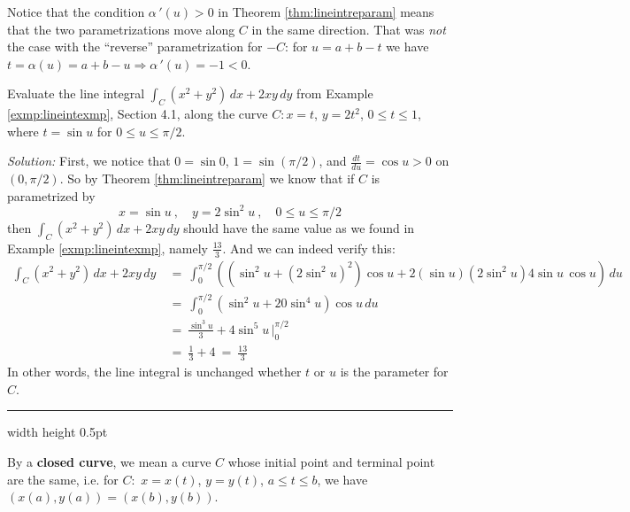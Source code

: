 Notice that the condition $\alpha\,'(u) > 0$ in Theorem \ref{thm:lineintreparam} means that the two parametrizations
move along $C$ in the same direction. That was \emph{not} the case with the ``reverse'' parametrization for $-C$: for
$u=a+b-t$ we have $t=\alpha(u)=a+b-u \Rightarrow \alpha\,'(u) = -1 <0$.
\newpage
\begin{exmp}
 Evaluate the line integral $\int_C (x^2 + y^2 )\,dx + 2xy\,dy$ from Example \ref{exmp:lineintexmp}, Section 4.1, along
 the curve $C: x=t$, $y=2t^2$, $0 \le t \le 1$, where $t=\sin u$ for $0 \le u \le \pi/2$.\vspace{1mm}
 \par\noindent \emph{Solution:} First, we notice that $0=\sin 0$, $1=\sin (\pi/2)$, and $\frac{dt}{du} = \cos u > 0$ on
 $(0,\pi/2)$. So by Theorem \ref{thm:lineintreparam} we know that if $C$ is parametrized by
 \begin{displaymath}
  x=\sin u ~,\quad y = 2\sin^2 u ~,\quad 0 \le u \le \pi/2
 \end{displaymath}
 then $\int_C (x^2 + y^2 )\,dx + 2xy\,dy$ should have the same value as we found in Example \ref{exmp:lineintexmp},
 namely $\frac{13}{3}$. And we can indeed verify this:
 \begin{align*}
  \int_C (x^2 + y^2 )\,dx + 2xy\,dy ~&=~ \int_0^{\pi/2} \left( (\sin^2 u + (2\sin^2 u)^2) \cos u +
   2(\sin u)(2\sin^2 u) 4\sin u \, \cos u \right)\,du\\
   &=~ \int_0^{\pi/2} \left( \sin^2 u + 20\sin^4 u \right) \cos u\,du\\
   &=~ \frac{\sin^3 u}{3} + 4\sin^5 u \,\Bigg|_0^{\pi/2}\\
   &=~ \frac{1}{3} + 4 ~=~ \frac{13}{3}
 \end{align*}
 In other words, the line integral is unchanged whether $t$ or $u$ is the parameter for $C$.
\end{exmp}
\hrule width \textwidth height 0.5pt
\vspace{3mm}

By a \textbf{closed curve}, we mean a curve $C$ whose initial point and terminal point are the same, i.e. for $C:$
$x=x(t)$, $y=y(t)$, $a \le t \le b$, we have $(x(a),y(a)) = (x(b),y(b))$.

